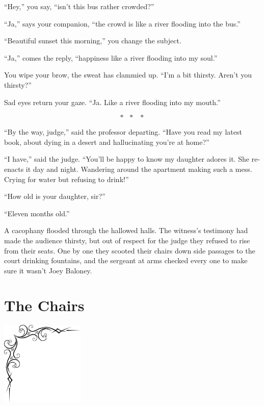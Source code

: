 \documentclass[oneside]{book}
\begin{document}
``Hey,'' you say, ``isn't this bus rather crowded?''

``Ja,'' says your companion, ``the crowd is like a river flooding into the bus.''

``Beautiful sunset this morning,'' you change the subject.

``Ja,'' comes the reply, ``happiness like a river flooding into my soul.''

You wipe your brow, the sweat has clammied up.
``I'm a bit thirsty.  Aren't you thirsty?''

Sad eyes return your gaze.
``Ja.  Like a river flooding into my mouth.''

\[*\mbox{ }*\mbox{ }*\]

``By the way, judge,'' said the professor departing.  ``Have you read my latest book, about dying in a desert
and hallucinating you're at home?''

``I have,'' said the judge.  ``You'll be happy to know my daughter adores it.
She re-enacts it day and night.  Wandering around the apartment making such a mess.
Crying for water but refusing to drink!''

``How old is your daughter, sir?''

``Eleven months old.''

\vspace{2mm}

A cacophany flooded through the hallowed halls.
The witness's testimony had made the audience thirsty,
but out of respect for the judge they refused to rise from their
seats.  One by one they scooted their chairs down side passages
to the court drinking fountains, and the sergeant at arms
checked every one to make sure it wasn't Joey Baloney.

\chapter{The Chairs}

\vspace{-2in}
\hspace{-.5in}
\includegraphics[width=150px]{ulcorner1.eps}
\end{document}
